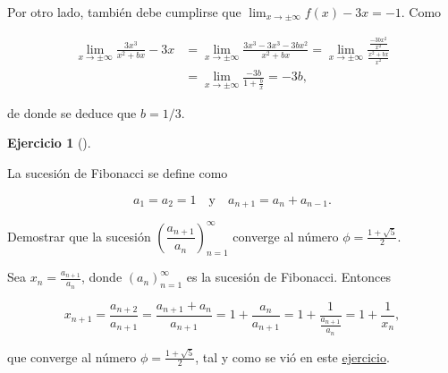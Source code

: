 \documentclass[
  spanish,
  a4paper,
]{scrreport}
\theoremstyle{definition}
\newtheorem{exercise}{Ejercicio}[chapter]
\theoremstyle{remark}
\begin{document}
\begin{tcolorbox}
\begin{enumerate}
  Por otro lado, también debe cumplirse que
  \(\lim_{x\to\pm\infty} f(x)-3x = -1\). Como

  \begin{align*}
  \lim_{x\to\pm\infty} \frac{3x^3}{x^2+bx} -3x 
  &= \lim_{x\to\pm\infty} \frac{3x^3-3x^3-3bx^2}{x^2+bx}
  = \lim_{x\to\pm\infty} \frac{\frac{-3bx^2}{x^2}}{\frac{x^2+bx}{x^2}} \\
  &= \lim_{x\to\pm\infty} \frac{-3b}{1+\frac{b}{x}}
  = -3b,
  \end{align*}

  de donde se deduce que \(b=1/3\).
\end{enumerate}

\end{tcolorbox}

\begin{exercise}[]\protect\hypertarget{exr-5}{}\label{exr-5}

La sucesión de Fibonacci se define como

\[
a_1 = a_2 = 1 \quad \mbox{y}\quad a_{n+1} = a_n + a_{n-1}.
\]

Demostrar que la sucesión
\(\left(\dfrac{a_{n+1}}{a_n}\right)_{n=1}^\infty\) converge al número
\(\phi = \frac{1+\sqrt{5}}{2}\).

\end{exercise}

\begin{tcolorbox}[enhanced jigsaw, arc=.35mm, bottomrule=.15mm, bottomtitle=1mm, breakable, colback=white, colbacktitle=quarto-callout-tip-color!10!white, colframe=quarto-callout-tip-color-frame, coltitle=black, left=2mm, leftrule=.75mm, opacityback=0, opacitybacktitle=0.6, rightrule=.15mm, title=\textcolor{quarto-callout-tip-color}{\faLightbulb}\hspace{0.5em}{Solución}, titlerule=0mm, toprule=.15mm, toptitle=1mm]

Sea \(x_n=\frac{a_{n+1}}{a_n}\), donde \((a_n)_{n=1}^\infty\) es la
sucesión de Fibonacci. Entonces

\[
x_{n+1} 
= \frac{a_{n+2}}{a_{n+1}}
= \frac{a_{n+1}+a_n}{a_{n+1}}
= 1 + \frac{a_{n}}{a_{n+1}}
= 1 + \frac{1}{\frac{a_{n+1}}{a_n}}
= 1 + \frac{1}{x_n},
\]

que converge al número \(\phi = \frac{1+\sqrt{5}}{2}\), tal y como se
vió en este
\href{https://aprendeconalf.es/analisis-ejercicios/04-sucesiones.html\#exr-numero-aureo}{ejercicio}.

\end{tcolorbox}

\end{document}
